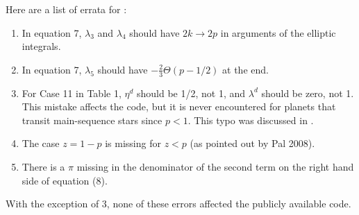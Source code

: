 \documentclass[modern]{aastex61}
\begin{document}
\appendix

Here are a list of errata for \citet{MandelAgol2002}:
\begin{enumerate}
\item In equation 7, $\lambda_3$ and $\lambda_4$ should have $2k \rightarrow
2p$ in arguments of the elliptic integrals.

\item In equation 7, $\lambda_5$ should have $- \frac{2}{3}\Theta(p-1/2)$
at the end.

\item For Case 11 in Table 1, $\eta^d$ should be 1/2, not 1, and
$\lambda^d$ should be zero, not 1.  This mistake affects the code,
but it is never encountered for planets that transit main-sequence
stars since $p<1$.  This typo was discussed in \citet{Eastman2013}.

\item The case $z=1-p$ is missing for $z<p$ (as pointed out by
Pal 2008).

\item There is a $\pi$ missing in the denominator of the second term
on the right hand side of equation (8).
\end{enumerate}

With the exception of 3, none of these errors affected the publicly
available code.
\end{document}
